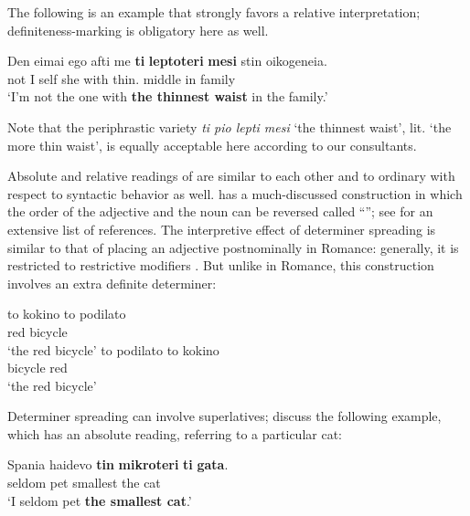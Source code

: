 \documentclass[output=paper
,modfonts
,nonflat]{langsci/langscibook}
\begin{document}
The following is an example that strongly favors a relative interpretation; definiteness\hyp{}marking is obligatory here as well.

\ea \label{ex:coppockstrand:8}
\gll Den eimai ego afti me \textbf{ti} \textbf{leptoteri} \textbf{mesi} stin oikogeneia.\\
not I self she with  thin.\cmpr{} middle in family\\
\glt `I'm not the one with \textbf{the thinnest waist} in the family.'
\z

Note that the periphrastic variety \textit{ti pio lepti mesi} `the thinnest waist', lit. `the more thin waist', is equally acceptable here according to our consultants.

Absolute and relative readings of  are similar to each other and to ordinary  with respect to syntactic behavior as well.  has a much-discussed construction in which the order of the adjective and the noun can be reversed called ``''; see \citet[19]{Alexiadou2014} for an extensive list of references. The interpretive effect of determiner spreading is similar to that of placing an adjective postnominally in Romance: generally, it is restricted to restrictive modifiers \citep{AlexiadouWilder1998}. But unlike in Romance, this construction involves an extra definite determiner:

\ea \label{ex:coppockstrand:9}
\begin{xlist}
\ex
\gll to kokino to podilato\\
  red   bicycle\\
\glt `the red bicycle'
\ex 
\gll  to podilato to kokino\\
   bicycle   red\\
\glt  `the red bicycle'
\end{xlist}
\z

Determiner spreading can involve superlatives; \citet{Alexiadou2014} discuss the following example, which has an absolute reading, referring to a particular cat:

\ea \label{ex:coppockstrand:10} 
\gll Spania haidevo \textbf{tin} \textbf{mikroteri} \textbf{ti} \textbf{gata}.\\
  seldom pet   smallest the cat\\
  \glt `I seldom pet \textbf{the smallest cat}.'
\z
\end{document}

